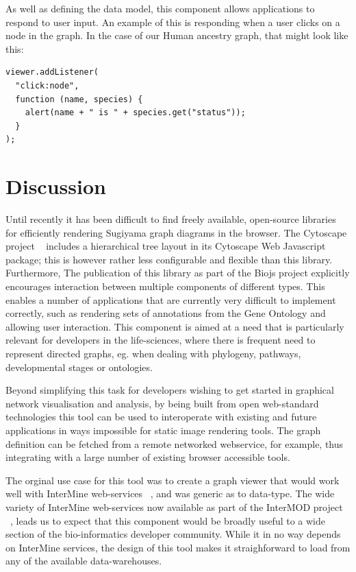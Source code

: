 \documentclass[10pt,a4paper,twocolumn]{article}
\begin{document}
As well as defining the data model, this component allows applications to
respond to user input. An example of this is responding when a user clicks on a
node in the graph. In the case of our Human ancestry graph, that might look like
this:

\begin{lstlisting}[caption={Listening for Events}, label={code:add-listener}]
viewer.addListener(
  "click:node",
  function (name, species) {
    alert(name + " is " + species.get("status"));
  }
);
\end{lstlisting}

\section*{Discussion}

Until recently it has been difficult to find freely available, open-source libraries for
efficiently rendering Sugiyama graph diagrams in the browser. The Cytoscape
project ~\cite{cytoscape} includes a hierarchical tree layout in its Cytoscape
Web Javascript package; this is however rather less configurable and flexible
than this library. Furthermore, The publication of
this library as part of the Biojs project explicitly encourages interaction
between multiple components of different types. This enables a number of applications that
are currently very difficult to implement correctly, such as rendering sets of
annotations from the Gene Ontology and allowing user interaction. This component is aimed at
a need that is particularly relevant for developers in the life-sciences, where
there is frequent need to represent directed graphs, eg.  when dealing with
phylogeny, pathways, developmental stages or ontologies.

Beyond simplifying this task for developers wishing to get started in graphical
network visualisation and analysis, by being built from open web-standard
technologies this tool can be used to interoperate with existing and future
applications in ways impossible for static image rendering tools. The graph
definition can be fetched from a remote networked webservice, for example, thus
integrating with a large number of existing browser accessible tools.

The orginal use case for this tool was to create a graph viewer that would work
well with InterMine web-services ~\cite{intermine}, and was generic as to data-type.  
The wide variety of InterMine web-services now available as part of the
InterMOD project ~\cite{intermod}, leads us to expect that this component would be
broadly useful to a wide section of the bio-informatics developer community.
While it in no way depends on InterMine services, the design of this tool makes
it straighforward to load from any of the available data-warehouses.
\end{document}
